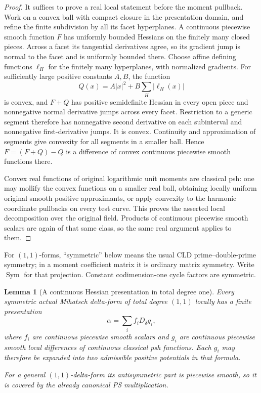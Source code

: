 \documentclass[11pt,a4paper]{article}
\numberwithin{equation}{section}
\newtheorem{lemma}[theorem]{Lemma}
\theoremstyle{definition}
\theoremstyle{remark}
\begin{document}
\begin{proof}
It suffices to prove a real local statement before the moment
pullback.  Work on a convex ball with compact closure in the
presentation domain, and refine the finite subdivision by all its
facet hyperplanes.  A continuous piecewise smooth function $F$ has
uniformly bounded Hessians on the finitely many closed pieces.
Across a facet its tangential derivatives agree, so its gradient
jump is normal to the facet and is uniformly bounded there.
Choose affine defining functions $\ell_H$ for the finitely many
hyperplanes, with normalized gradients.  For sufficiently large
positive constants $A,B$, the function
\[
                     Q(x)=A|x|^2+B\sum_H|\ell_H(x)|
\]
is convex, and $F+Q$ has positive semidefinite Hessian in every
open piece and nonnegative normal derivative jumps across every
facet.  Restriction to a generic segment therefore has nonnegative
second derivative on each subinterval and nonnegative first-derivative
jumps.  It is convex.  Continuity and approximation of segments
give convexity for all segments in a smaller ball.  Hence
$F=(F+Q)-Q$ is a difference of convex continuous piecewise smooth
functions there.

Convex real functions of original logarithmic unit moments are
classical psh: one may mollify the convex functions on a smaller
real ball, obtaining locally uniform original smooth positive
approximants, or apply convexity to the harmonic coordinate
pullbacks on every test curve.  This proves the asserted local
decomposition over the original field.  Products of continuous
piecewise smooth scalars are again of that same class, so the
same real argument applies to them.
\end{proof}

For $(1,1)$-forms, ``symmetric'' below means the usual CLD
prime--double-prime symmetry; in a moment coefficient matrix it
is ordinary matrix symmetry.  Write $\operatorname{Sym}$ for that
projection.  Constant codimension-one cycle factors are symmetric.

\begin{lemma}[A continuous Hessian presentation in total degree one]
\label{lem:r6-degree-one-hessian-presentation}
Every symmetric actual Mihatsch delta-form of total degree $(1,1)$
locally has a finite presentation
\[
                         \alpha=\sum_i f_iD_\delta g_i,
\]
where $f_i$ are continuous piecewise smooth scalars and $g_i$ are
continuous piecewise smooth local differences of continuous
classical psh functions.  Each $g_i$ may therefore be expanded
into two admissible positive potentials in that formula.

For a general $(1,1)$-delta-form its antisymmetric part is piecewise
smooth, so it is covered by the already canonical PS multiplication.
\end{lemma}
\end{document}
